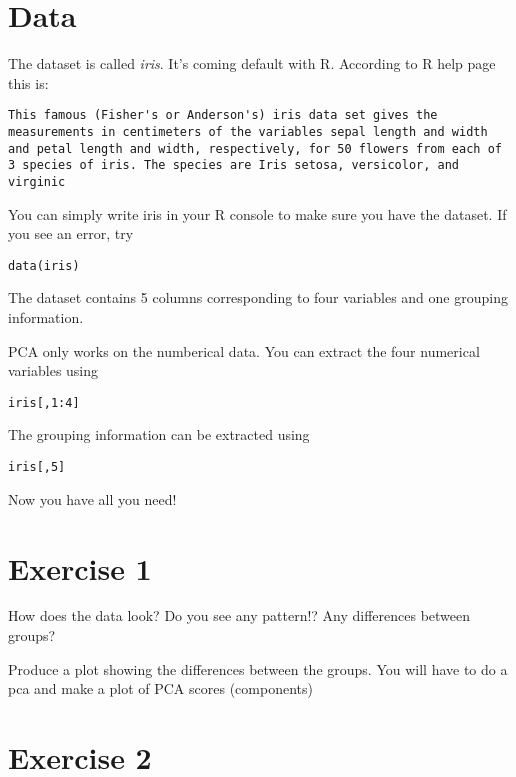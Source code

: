 \documentclass[
]{book}
\theoremstyle{definition}
\theoremstyle{definition}
\theoremstyle{definition}
\theoremstyle{remark}
\begin{document}
\hypertarget{data}{%
\section{Data}\label{data}}

The dataset is called \emph{iris}. It's coming default with R. According to R help page this is:

\begin{verbatim}
This famous (Fisher's or Anderson's) iris data set gives the measurements in centimeters of the variables sepal length and width and petal length and width, respectively, for 50 flowers from each of 3 species of iris. The species are Iris setosa, versicolor, and virginic
\end{verbatim}

You can simply write iris in your R console to make sure you have the dataset. If you see an error, try

\begin{verbatim}
data(iris)
\end{verbatim}

The dataset contains 5 columns corresponding to four variables and one grouping information.

PCA only works on the numberical data. You can extract the four numerical variables using

\begin{verbatim}
iris[,1:4]
\end{verbatim}

The grouping information can be extracted using

\begin{verbatim}
iris[,5]
\end{verbatim}

Now you have all you need!

\hypertarget{exercise-1}{%
\section{Exercise 1}\label{exercise-1}}

How does the data look? Do you see any pattern!? Any differences between groups?

Produce a plot showing the differences between the groups. You will have to do a pca and make a plot of PCA scores (components)

\hypertarget{exercise-2}{%
\section{Exercise 2}\label{exercise-2}}
\end{document}
